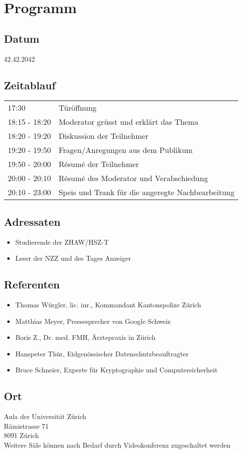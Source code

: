 \section{Programm}
\subsection*{Datum}
42.42.2042

\subsection*{Zeitablauf}
\begin{tabular}{ll}
17:30	& Türöffnung\\
18:15 - 18:20 & Moderator grüsst und erklärt das Thema\\
18:20 - 19:20 & Diskussion der Teilnehmer\\
19:20 - 19:50 & Fragen/Anregungen aus dem Publikum\\
19:50 - 20:00 & Résumé der Teilnehmer\\ %
20:00 - 20:10 & Résumé des Moderator und Verabschiedung\\ %
20:10 - 23:00 & Speis und Trank für die angeregte Nachbearbeitung\\
\end{tabular}

\subsection*{Adressaten}
\begin{itemize}
 \item Studierende der ZHAW/HSZ-T
 \item Leser der NZZ und des Tages Anzeiger
\end{itemize}


\subsection*{Referenten}
\begin{itemize}
\item Thomas Würgler, lic. iur., Kommandant Kantonspolize Zürich
\item Matthias Meyer, Pressesprecher von Google Schweiz
\item Boris Z., Dr. med. FMH, Ärztepraxis in Zürich
\item Hanspeter Thür, Eidgenössischer Datenschutzbeauftragter
\item Bruce Schneier, Experte für Kryptographie und Computersicherheit
\end{itemize}

\subsection*{Ort}
Aula der Universität Zürich\\
Rämistrasse 71\\
8091 Zürich \\
\newline
Weitere Säle können nach Bedarf durch Videokonferenz zugeschaltet werden
